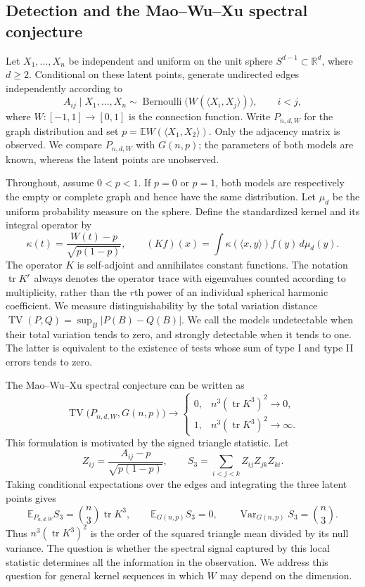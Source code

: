 \documentclass[11pt,reqno]{amsart}
\numberwithin{equation}{section}
\theoremstyle{definition}
\theoremstyle{remark}
\theoremstyle{definition}
\DeclareMathOperator{\tr}{tr}
\DeclareMathOperator{\Var}{Var}
\DeclareMathOperator{\TV}{TV}
\begin{document}
\subsection{Detection and the Mao--Wu--Xu spectral conjecture}
Let $X_1,\ldots,X_n$ be independent and uniform on the unit sphere $S^{d-1}\subset\mathbb R^d$, where $d\ge2$.
Conditional on these latent points, generate undirected edges independently according to
\[
 A_{ij}\mid X_1,\ldots,X_n
 \sim\operatorname{Bernoulli}\bigl(W(\langle X_i,X_j\rangle)\bigr),\qquad i<j,
\]
where $W:[-1,1]\to[0,1]$ is the connection function.
Write $P_{n,d,W}$ for the graph distribution and set
$p=\mathbb EW(\langle X_1,X_2\rangle)$.
Only the adjacency matrix is observed. We compare $P_{n,d,W}$ with $G(n,p)$;
the parameters of both models are known, whereas the latent points are unobserved.

Throughout, assume $0<p<1$. If $p=0$ or $p=1$, both models are respectively the empty or complete graph and hence have the same distribution.
Let $\mu_d$ be the uniform probability measure on the sphere. Define the standardized kernel and its integral operator by
\begin{equation}\label{eq:normalized-operator}
 \kappa(t)=\frac{W(t)-p}{\sqrt{p(1-p)}},\qquad
 (Kf)(x)=\int\kappa(\langle x,y\rangle)f(y)\,d\mu_d(y).
\end{equation}
The operator $K$ is self-adjoint and annihilates constant functions.
The notation $\tr K^r$ always denotes the operator trace with eigenvalues counted according to multiplicity,
rather than the $r$th power of an individual spherical harmonic coefficient.
We measure distinguishability by the total variation distance
$\TV(P,Q)=\sup_B|P(B)-Q(B)|$.
We call the models undetectable when their total variation tends to zero, and strongly detectable when it tends to one.
The latter is equivalent to the existence of tests whose sum of type I and type II errors tends to zero.

The Mao--Wu--Xu spectral conjecture \cite[Section 2.5, Conjecture 1]{MWX} can be written as
\begin{equation}\label{eq:MWX-conjecture}
 \TV\bigl(P_{n,d,W},G(n,p)\bigr)\longrightarrow
 \begin{cases}
 0,& n^3(\tr K^3)^2\longrightarrow0,\\[2pt]
 1,& n^3(\tr K^3)^2\longrightarrow\infty.
 \end{cases}
\end{equation}
This formulation is motivated by the signed triangle statistic. Let
\[
 Z_{ij}=\frac{A_{ij}-p}{\sqrt{p(1-p)}},\qquad
 S_3=\sum_{i<j<k}Z_{ij}Z_{jk}Z_{ki}.
\]
Taking conditional expectations over the edges and integrating the three latent points gives
\[
 \mathbb E_{P_{n,d,W}}S_3=\binom n3\tr K^3,
 \qquad \mathbb E_{G(n,p)}S_3=0,
 \qquad \Var_{G(n,p)}S_3=\binom n3.
\]
Thus $n^3(\tr K^3)^2$ is the order of the squared triangle mean divided by its null variance.
The question is whether the spectral signal captured by this local statistic determines all the information in the observation.
We address this question for general kernel sequences in which $W$ may depend on the dimension.
\end{document}
